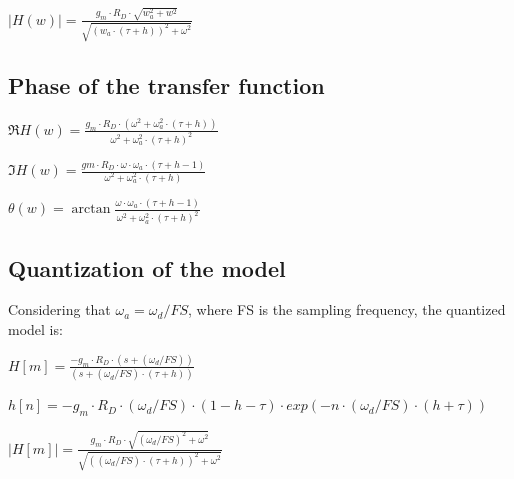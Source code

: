 \documentclass{article}
\begin{document}
\centerline{$ |H(w)| = \frac{g_m \cdot R_D \cdot \sqrt{w_a^2 + w^2}}{\sqrt{(w_a \cdot (\tau + h))^2 + \omega^2}}
	$}
\vspace{\baselineskip}

\subsection{Phase of the transfer function}

\centerline{$ \Re{H(w)} = \frac{g_m \cdot R_D \cdot (\omega^2 + \omega_a^2 \cdot (\tau + h))}{\omega^2 + \omega_a^2 \cdot (\tau + h)^2}
	$}
\vspace{\baselineskip}

\centerline{$ \Im{H(w)} = \frac{gm \cdot R_D \cdot \omega \cdot \omega_a \cdot (\tau + h - 1)}{\omega^2 + \omega_a^2 \cdot (\tau + h)}
	$}
\vspace{\baselineskip}

\begin{question}
	\centerline{$ \theta(w) = \arctan{\frac{\omega \cdot \omega_a \cdot (\tau + h - 1)}{\omega^2 + \omega_a^2 \cdot (\tau + h)^2}}
		$}
\end{question}

\subsection{Quantization of the model}

Considering that $\omega_{a} = \omega_{d} / FS$, where FS is the sampling frequency, the quantized model is:

\begin{question}
	\centerline{$ H[m] = \frac{-g_m \cdot R_D \cdot (s + (\omega_d / FS))}{(s + (\omega_d / FS) \cdot (\tau + h))}
		$}
\end{question}

\begin{question}
	\centerline{$ h[n] = -g_m \cdot R_D \cdot (\omega_d / FS) \cdot (1 - h - \tau) \cdot exp(-n \cdot (\omega_d / FS) \cdot (h + \tau) )
		$}
\end{question}

\begin{question}
\centerline{$ |H[m]| = \frac{g_m \cdot R_D \cdot \sqrt{(\omega_d / FS)^2 + \omega^2}}{\sqrt{((\omega_d / FS) \cdot (\tau + h))^2 + \omega^2}}
	$}
\vspace{\baselineskip}
\end{question}
\end{document}
